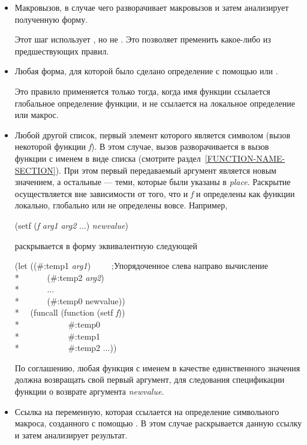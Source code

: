 \begin{defmac}
\begin{itemize}
\item 
Макровызов, в случае чего  разворачивает макровызов и затем
анализирует полученную форму.

Этот шаг использует , но не .  Это
позволяет пременить какое-либо из предшествующих правил.

\item 
Любая форма, для которой было сделано определение с помощью  или
.

Это правило применяется только тогда, когда имя функции ссылается глобальное
определение функции, и не ссылается на локальное определение или макрос.

\item
Любой другой список, первый элемент которого является символом (вызов некоторой
функции \emph{f}). В этом случае, вызов  разворачивается в вызов
функции с именем в виде списка  (смотрите
раздел~\ref{FUNCTION-NAME-SECTION}). При этом первый передаваемый аргумент
является новым значением, а остальные --- теми, которые были указаны в
\emph{place}. Раскрытие осуществляется вне зависимости от того, что и \emph{f}
и  определены как функции локально, глобально или не
определены вовсе. Например,

\begin{lisp}
(setf (\emph{f\/} \emph{arg1} \emph{arg2} ...) \emph{newvalue})
\end{lisp}
раскрывается в форму эквивалентную следующей
\begin{lisp}
(let ((\#:temp1 \emph{arg1})~~~~~;\textrm{Упорядоченное слева направо вычисление} \\*
~~~~~~(\#:temp2 \emph{arg2}) \\*
~~~~~~... \\*
~~~~~~(\#:temp0 newvalue)) \\*
~~(funcall (function (setf \emph{f\/})) \\*
~~~~~~~~~~~\#:temp0 \\*
~~~~~~~~~~~\#:temp1 \\*
~~~~~~~~~~~\#:temp2 ...))
\end{lisp}
По соглашению, любая функция с именем  в качестве
единственного значения должна возвращать свой первый аргумент, для следования
спецификации функции  о возврате аргумента \emph{newvalue}.

\item
Ссылка на переменную, которая ссылается на определение символьного макроса,
созданного с помощью . В этом случае  раскрывается
данную ссылку и затем анализирует результат.
\end{itemize}


\end{defmac}
